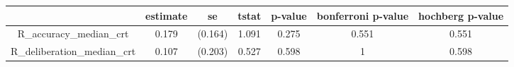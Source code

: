 \begin{tabular}{ccccccc}
  \hline
 & estimate & se & tstat & p-value & bonferroni p-value & hochberg p-value \\ 
  \hline
R\_accuracy\_median\_crt & 0.179 & (0.164) & 1.091 & 0.275 & 0.551 & 0.551 \\ 
  R\_deliberation\_median\_crt & 0.107 & (0.203) & 0.527 & 0.598 & 1 & 0.598 \\ 
   \hline
\end{tabular}
